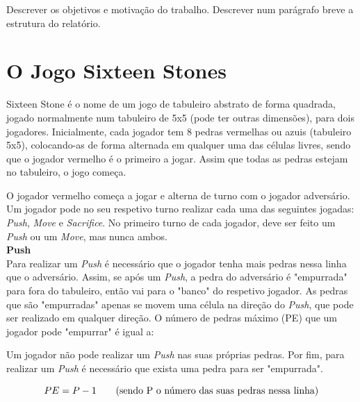 \documentclass[a4paper]{article}
\begin{document}
Descrever os objetivos e motivação do trabalho. Descrever num parágrafo breve a estrutura do relatório.


\section{O Jogo Sixteen Stones}

Sixteen Stone é o nome de um jogo de tabuleiro abstrato de forma quadrada, jogado normalmente num tabuleiro de 5x5 (pode ter outras dimensões), para dois jogadores. Inicialmente, cada jogador tem 8 pedras vermelhas ou azuis (tabuleiro 5x5), colocando-as de forma alternada em qualquer uma das células livres, sendo que o jogador vermelho é o primeiro a jogar. Assim que todas as pedras estejam no tabuleiro, o jogo começa. 

O jogador vermelho começa a jogar e alterna de turno com o jogador adversário. Um jogador pode no seu respetivo turno realizar cada uma das seguintes jogadas: \textit{Push}, \textit{Move} e \textit{Sacrifice}. No primeiro turno de cada jogador, deve ser feito um \textit{Push} ou um \textit{Move}, mas nunca ambos. \\

\textbf{Push}\\

Para realizar um  \textit{Push} é necessário que o jogador tenha mais pedras nessa linha que o adversário. Assim, se após um  \textit{Push}, a pedra do adversário é "empurrada" para fora do tabuleiro, então vai para o "banco" do respetivo jogador. As pedras que são "empurradas" apenas se movem uma célula na direção do \textit{Push}, que pode ser realizado em qualquer direção. O número de pedras máximo (PE) que um jogador pode "empurrar" é igual a:

Um jogador não pode realizar um  \textit{Push} nas suas próprias pedras. 
Por fim, para realizar um \textit{Push} é necessário que exista uma pedra para ser "empurrada".

\begin{equation}
	PE = P - 1 \text{\hspace{7mm}(sendo P o número das suas pedras nessa linha)}
\end{equation}
\end{document}
